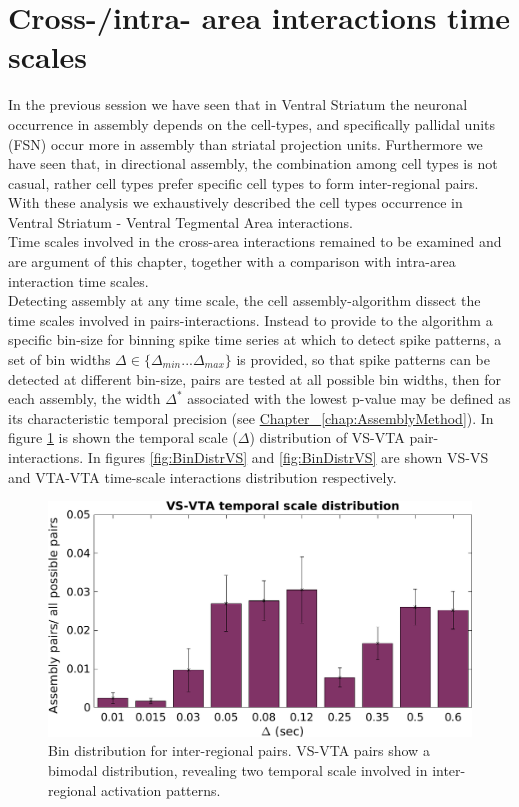 \section{Cross-/intra- area interactions time scales}
\label{sec:TimeScales}
In the previous session we have seen that in Ventral Striatum the neuronal occurrence in assembly depends on the cell-types, and specifically pallidal units (FSN) occur more in assembly than striatal projection units. Furthermore we have seen that, in directional assembly, the combination among cell types is not casual, rather cell types prefer specific cell types to form inter-regional pairs.
With these analysis we exhaustively described the cell types occurrence in Ventral Striatum - Ventral Tegmental Area interactions.\\Time scales involved in the cross-area interactions remained to be examined and are argument of this chapter, together with a comparison with intra-area interaction time scales.\\
Detecting assembly at any time scale, the cell assembly-algorithm dissect the time scales involved in pairs-interactions. Instead to provide to the algorithm a specific bin-size for binning spike time series at which to detect spike patterns, a set of bin widths $\Delta \in \{\Delta_{min}...\Delta_{max}\}$ is provided, so that spike patterns can be detected at different bin-size, pairs are tested at all possible bin widths, then for each assembly, the width $\Delta^*$ associated with the lowest p-value may be defined as its characteristic temporal precision (see \hyperref[chap:AssemblyMethod]{Chapter~ \ref*{chap:AssemblyMethod}}).
In figure \ref{fig:BinDistr} is shown the temporal scale ($\Delta$) distribution of VS-VTA pair-interactions.
In figures \ref{fig:BinDistrVS} and \ref{fig:BinDistrVS} are shown VS-VS and VTA-VTA time-scale interactions distribution respectively.\\
\begin{figure}[H]
\includegraphics[scale=0.5]{figures/VS_VTA_Short1.png}
\caption{Bin distribution for inter-regional pairs. VS-VTA pairs show a bimodal distribution, revealing two temporal scale involved in inter-regional activation patterns.}
\label{fig:BinDistr}
\end{figure}
